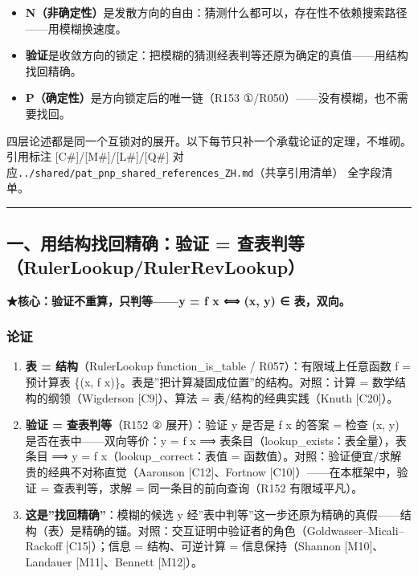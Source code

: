 \documentclass[
]{article}
\providecommand{\tightlist}{%
  \setlength{\itemsep}{0pt}\setlength{\parskip}{0pt}}
\begin{document}
\begin{itemize}
\tightlist
\item
  \textbf{N（非确定性）}是发散方向的自由：猜测什么都可以，存在性不依赖搜索路径------用模糊换速度。
\item
  \textbf{验证}是收敛方向的锁定：把模糊的猜测经表判等还原为确定的真值------用结构找回精确。
\item
  \textbf{P（确定性）}是方向锁定后的唯一链（R153
  ①/R050）------没有模糊，也不需要找回。
\end{itemize}

四层论述都是同一个互锁对的展开。以下每节只补一个承载论证的定理，不堆砌。引用标注
{[}C\#{]}/{[}M\#{]}/{[}L\#{]}/{[}Q\#{]}
对应\texttt{../shared/pat\_pnp\_shared\_references\_ZH.md}（共享引用清单）
全字段清单。

\begin{center}\rule{0.5\linewidth}{0.5pt}\end{center}

\subsection{一、用结构找回精确：验证 =
查表判等（RulerLookup/RulerRevLookup）}\label{ux4e00ux7528ux7ed3ux6784ux627eux56deux7cbeux786eux9a8cux8bc1-ux67e5ux8868ux5224ux7b49rulerlookuprulerrevlookup}

\textbf{★核心：验证不重算，只判等------y = f x ⟺ (x, y) ∈ 表，双向。}

\subsubsection{论证}\label{ux8bbaux8bc1}

\begin{enumerate}
\def\labelenumi{\arabic{enumi}.}
\tightlist
\item
  \textbf{表 = 结构}（RulerLookup function\_is\_table /
  R057）：有限域上任意函数 f = 预计算表 \{(x, f
  x)\}。表是''把计算凝固成位置''的结构。对照：计算 =
  数学结构的纲领（Wigderson {[}C9{]}）、算法 = 表/结构的经典实践（Knuth
  {[}C20{]}）。
\item
  \textbf{验证 = 查表判等}（R152 ② 展开）：验证 y 是否是 f x 的答案 =
  检查 (x, y) 是否在表中------双向等价：y = f x ⟹
  表条目（lookup\_exists：表全量），表条目 ⟹ y = f
  x（lookup\_correct：表值 =
  函数值）。对照：验证便宜/求解贵的经典不对称直觉（Aaronson
  {[}C12{]}、Fortnow {[}C10{]}）------在本框架中，验证 = 查表判等，求解
  = 同一条目的前向查询（R152 有限域平凡）。
\item
  \textbf{这是''找回精确''}：模糊的候选 y
  经''表中判等''这一步还原为精确的真假------结构（表）是精确的锚。对照：交互证明中验证者的角色（Goldwasser--Micali--Rackoff
  {[}C15{]}）；信息 = 结构、可逆计算 = 信息保持（Shannon
  {[}M10{]}、Landauer {[}M11{]}、Bennett {[}M12{]}）。
\end{enumerate}
\end{document}
